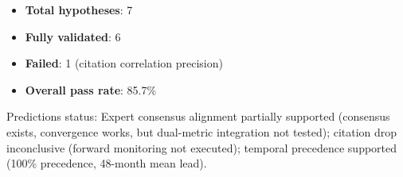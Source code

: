 
\begin{itemize}
\item \textbf{Total hypotheses}: 7
\item \textbf{Fully validated}: 6
\item \textbf{Failed}: 1 (citation correlation precision)
\item \textbf{Overall pass rate}: 85.7\%
\end{itemize}

Predictions status: Expert consensus alignment partially supported (consensus exists, convergence works, but dual-metric integration not tested); citation drop inconclusive (forward monitoring not executed); temporal precedence supported (100\% precedence, 48-month mean lead).

